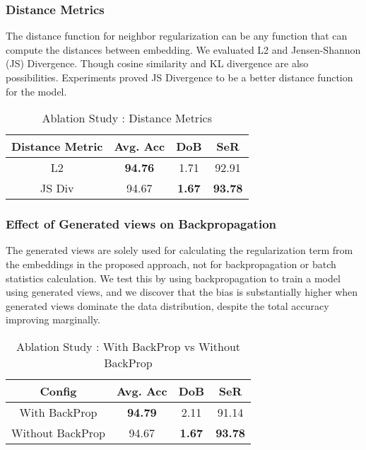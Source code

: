 \documentclass[runningheads]{llncs}
\begin{document}
\subsubsection{Distance Metrics}
The distance function  for neighbor regularization can be any function that can compute the distances between embedding. We evaluated L2 and Jensen-Shannon (JS) Divergence. Though cosine similarity and KL divergence are also possibilities. Experiments proved JS Divergence to be a better distance function for the model.
\begin{table}[H]
    \centering
    \caption{Ablation Study : Distance Metrics}
    \label{tab:ablate_dist}
    \begin{tabular}{cccc} 
    \toprule
    \textbf{Distance Metric} & \textbf{Avg. Acc } & \textbf{DoB } & \textbf{SeR } \\ \midrule
    L2 & \textbf{94.76} & 1.71 & 92.91 \\
    JS Div & 94.67 & \textbf{1.67} & \textbf{93.78}\\
    \bottomrule
    \end{tabular}
\end{table}

\subsubsection{Effect of Generated views on Backpropagation}
The generated views are solely used for calculating the regularization term from the embeddings in the proposed approach, not for backpropagation or batch statistics calculation. We test this by using backpropagation to train a model using generated views, and we discover that the bias is substantially higher when generated views dominate the data distribution, despite the total accuracy improving marginally.
\begin{table}[H]
    \centering
    \caption{Ablation Study : With BackProp vs Without BackProp}
    \label{tab:ablate_backprop}
    \begin{tabular}{cccc} 
    \toprule
    \textbf{Config} & \textbf{Avg. Acc } & \textbf{DoB } & \textbf{SeR } \\ \midrule
    With BackProp & \textbf{94.79} & 2.11 & 91.14 \\
    Without BackProp & 94.67 & \textbf{1.67} & \textbf{93.78}\\
    \bottomrule
    \end{tabular}
\end{table}
\end{document}
